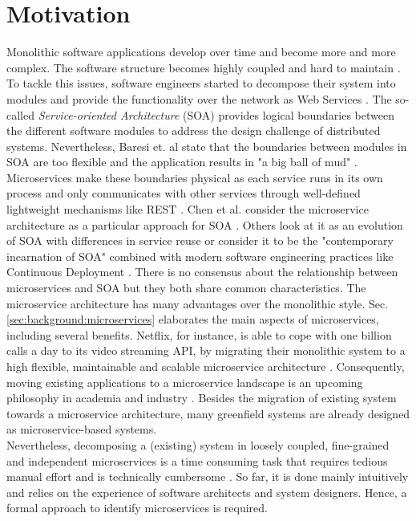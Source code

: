 \section{Motivation}
\label{sec:Introduction:Motivation}
Monolithic software applications develop over time and become more and more complex. The software structure becomes highly coupled and hard to maintain \cite{MigratingTowardsSurvey}. To tackle this issues, software engineers started to decompose their system into modules and provide the functionality over the network as Web Services \cite{ServiceCutter}. The so-called \textit{Service-oriented Architecture} (SOA) provides logical boundaries between the different software modules to address the design challenge of distributed systems. Nevertheless, Baresi et. al state that the boundaries between modules in SOA are too flexible and the application results in "a big ball of mud" \cite{interfaceAnalysisBaresi}. Microservices make these boundaries physical as each service runs in its own process and only communicates with other services through well-defined lightweight mechanisms like REST \cite{FunctionalDecompositionHeinrich}. Chen et al. consider the microservice architecture as a particular approach for SOA \cite{DataflowDrivenChen}. Others look at it as an evolution of SOA with differences in service reuse \cite{interfaceAnalysisBaresi} or consider it to be the "contemporary incarnation of SOA" combined with modern software engineering practices like Continuous Deployment \cite{ServiceCutter}. There is no consensus about the relationship between microservices and SOA but they both share common characteristics.
The microservice architecture has many advantages over the monolithic style. Sec.\ref{sec:background:microservices} elaborates the main aspects of microservices, including several benefits. Netflix, for instance, is able to cope with one billion calls a day to its video streaming API, by migrating their monolithic system to a high flexible, maintainable and scalable microservice architecture \cite{DataflowDrivenChen}. Consequently, moving existing applications to a microservice landscape is an upcoming philosophy in academia and industry \cite{ObjectAwareAmiri}. Besides the migration of existing system towards a microservice architecture, many greenfield systems are already designed as microservice-based systems. \\
Nevertheless, decomposing a (existing) system in loosely coupled, fine-grained and independent microservices is a time consuming task that requires tedious manual effort \cite{ServiceCutter} and is technically cumbersome \cite{HeuristicsAlwis}. So far, it is done mainly intuitively and relies on the experience of software architects and system designers. Hence, a formal approach to identify microservices is required. 



